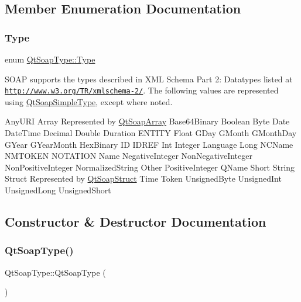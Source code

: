 \subsection{Member Enumeration Documentation}
\mbox{\label{class_qt_soap_type_a840b69f1d92eeb4e64ae1e0439d54683}} 
\subsubsection{\texorpdfstring{Type}{Type}}
{\footnotesize\ttfamily enum \mbox{\hyperlink{class_qt_soap_type_a840b69f1d92eeb4e64ae1e0439d54683}{Qt\+Soap\+Type\+::\+Type}}}

S\+O\+AP supports the types described in X\+ML Schema Part 2\+: Datatypes listed at  \href{http://www.w3.org/TR/xmlschema-2/}{\tt http\+://www.\+w3.\+org/\+T\+R/xmlschema-\/2/}. The following values are represented using \mbox{\hyperlink{class_qt_soap_simple_type}{Qt\+Soap\+Simple\+Type}}, except where noted.

Any\+U\+RI  Array Represented by \mbox{\hyperlink{class_qt_soap_array}{Qt\+Soap\+Array}}  Base64\+Binary  Boolean  Byte  Date  Date\+Time  Decimal  Double  Duration  E\+N\+T\+I\+TY  Float  G\+Day  G\+Month  G\+Month\+Day  G\+Year  G\+Year\+Month  Hex\+Binary  ID  I\+D\+R\+EF  Int  Integer  Language  Long  N\+C\+Name  N\+M\+T\+O\+K\+EN  N\+O\+T\+A\+T\+I\+ON  Name  Negative\+Integer  Non\+Negative\+Integer  Non\+Positive\+Integer  Normalized\+String  Other  Positive\+Integer  Q\+Name  Short  String  Struct Represented by \mbox{\hyperlink{class_qt_soap_struct}{Qt\+Soap\+Struct}}  Time  Token  Unsigned\+Byte  Unsigned\+Int  Unsigned\+Long  Unsigned\+Short 

\subsection{Constructor \& Destructor Documentation}
\mbox{\label{class_qt_soap_type_a8bc4a7b3e1d27a30a52ce1f05bddb6f2}} 
\subsubsection{\texorpdfstring{Qt\+Soap\+Type()}{QtSoapType()}\hspace{0.1cm}{\footnotesize\ttfamily [1/3]}}
{\footnotesize\ttfamily Qt\+Soap\+Type\+::\+Qt\+Soap\+Type (\begin{DoxyParamCaption}{ }\end{DoxyParamCaption})}

